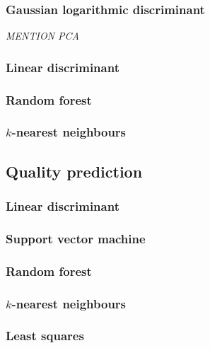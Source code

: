 \documentclass[twoside]{article}
\begin{document}
\begin{multicols}{2}
\subsubsection{Gaussian logarithmic discriminant}

\emph{MENTION PCA}

\subsubsection{Linear discriminant}

\subsubsection{Random forest}

\subsubsection{$k$-nearest neighbours}

\subsection{Quality prediction}

\subsubsection{Linear discriminant}

\subsubsection{Support vector machine}

\subsubsection{Random forest}

\subsubsection{$k$-nearest neighbours}

\subsubsection{Least squares}



\end{multicols}
\end{document}
